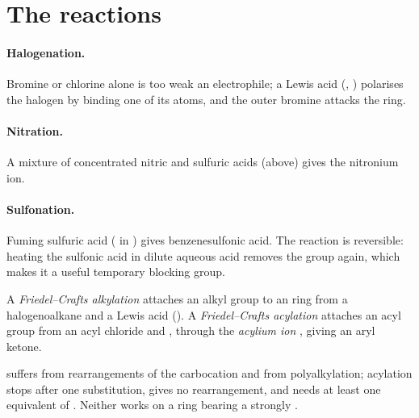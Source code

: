 \section{The reactions}

\paragraph{Halogenation.} Bromine or chlorine alone is too weak an electrophile; a Lewis acid
(, ) polarises the halogen by binding one of its atoms, and the outer
bromine attacks the ring.

\paragraph{Nitration.} A mixture of concentrated nitric and sulfuric acids (above) gives the
nitronium ion.

\paragraph{Sulfonation.} Fuming sulfuric acid ( in ) gives benzenesulfonic acid.
The reaction is reversible: heating the sulfonic acid in dilute aqueous acid removes the
 group again, which makes it a useful temporary blocking group.

\begin{definition}\label{def:b2:aromatic-substitution:friedel-crafts}
A \emph{Friedel--Crafts alkylation} attaches an alkyl
group to an  ring from a halogenoalkane and a Lewis acid (). A
\emph{Friedel--Crafts acylation} attaches an acyl group
 from an acyl chloride and , through the \emph{acylium ion}
, giving an aryl ketone.
\end{definition}

\begin{proposition}\label{prop:b2:aromatic-substitution:friedel-crafts-limits}
 suffers from rearrangements of the carbocation and from
polyalkylation; acylation stops after one substitution, gives no rearrangement, and needs at
least one equivalent of . Neither works on a ring bearing a strongly .
\end{proposition}

